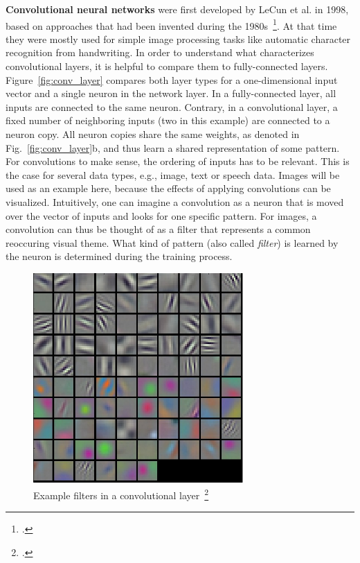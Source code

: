 \textbf{Convolutional neural networks} were first developed by LeCun et al. in 1998,
based on approaches that had been invented during the 1980s~\footcite{Fukushima1980, LeCun1998}.
At that time they were mostly used for simple image processing tasks like
automatic character recognition from handwriting.
In order to understand what characterizes convolutional layers, it is helpful
to compare them to fully-connected layers.
Figure~\ref{fig:conv_layer} compares both layer types for a one-dimensional
input vector and a single neuron in the network layer.
In a fully-connected layer, all inputs are connected to the same neuron.
Contrary, in a convolutional layer, a fixed number of neighboring inputs (two in this example)
are connected to a neuron copy.
All neuron copies share the same weights, as denoted in Fig.~\ref{fig:conv_layer}b,
and thus learn a shared representation of some pattern.
For convolutions to make sense, the ordering of inputs has to be relevant.
This is the case for several data types, e.g., image, text or speech data.
Images will be used as an example here, because the effects of applying
convolutions can be visualized.
Intuitively, one can imagine a convolution as a neuron that is moved over the
vector of inputs and looks for one specific pattern.
For images, a convolution can thus be thought of as a filter that represents
a common reoccuring visual theme.
What kind of pattern (also called \textit{filter}) is learned by the neuron is
determined during the training process.

\begin{figure}[h]
  \includegraphics[height=8cm]{img/conv_filters.jpeg}
  \caption[Example filters in a convolutional layer]{Example filters in a convolutional layer~\footcite{Krizhevsky2012}}
\label{fig:conv_examples}
\end{figure}


